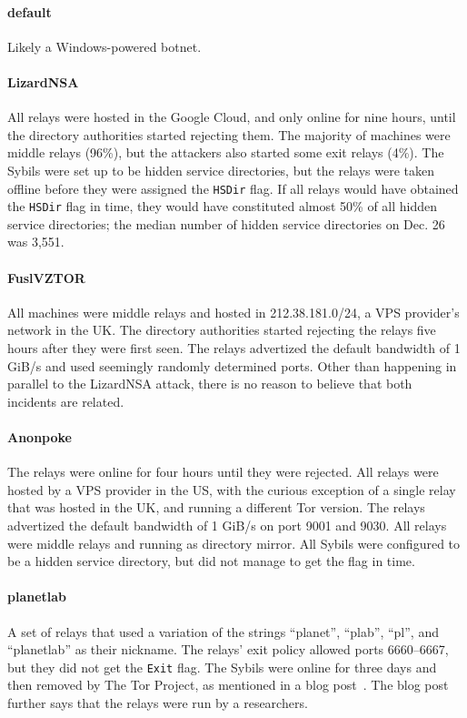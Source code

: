 \paragraph{default}
Likely a Windows-powered botnet.

\paragraph{LizardNSA}
All relays were hosted in the Google Cloud, and only online for nine hours,
until the directory authorities started rejecting them.  The majority of
machines were middle relays (96\%), but the attackers also started some exit
relays (4\%).  The Sybils were set up to be hidden service directories, but the
relays were taken offline before they were assigned the \texttt{HSDir} flag.  If
all relays would have obtained the \texttt{HSDir} flag in time, they would have
constituted almost 50\% of all hidden service directories; the median number of
hidden service directories on Dec. 26 was 3,551.

\paragraph{FuslVZTOR}
All machines were middle relays and hosted in 212.38.181.0/24, a VPS provider's
network in the UK.  The directory authorities started rejecting the relays five
hours after they were first seen.  The relays advertized the default bandwidth
of 1 GiB/s and used seemingly randomly determined ports.  Other than happening
in parallel to the LizardNSA attack, there is no reason to believe that both
incidents are related.

\paragraph{Anonpoke}
The relays were online for four hours until they were rejected.  All relays were
hosted by a VPS provider in the US, with the curious exception of a single relay
that was hosted in the UK, and running a different Tor version.  The relays
advertized the default bandwidth of 1 GiB/s on port 9001 and 9030.  All relays
were middle relays and running as directory mirror.  All Sybils were configured
to be a hidden service directory, but did not manage to get the flag in time.

\paragraph{planetlab}
A set of relays that used a variation of the strings ``planet'', ``plab'',
``pl'', and ``planetlab'' as their nickname.  The relays' exit policy allowed
ports 6660--6667, but they did not get the \texttt{Exit} flag.  The Sybils were
online for three days and then removed by The Tor Project, as mentioned in a
blog post~\cite{planetlab}.  The blog post further says that the relays were run
by a researchers.
